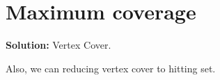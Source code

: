 \section{Maximum coverage}
{\bf Solution:} Vertex Cover.

Also, we can reducing vertex cover to hitting set.